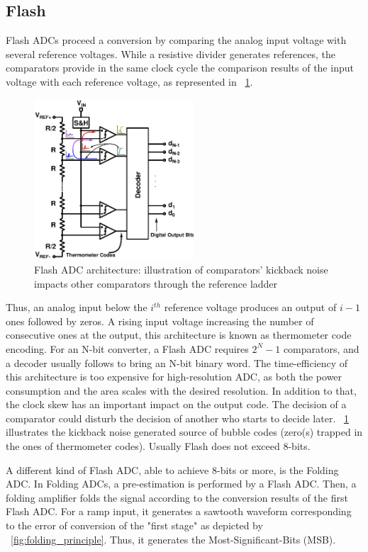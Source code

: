 \subsection{Flash}                             %
\label{sec:flash-adc}
Flash ADCs proceed a conversion by comparing the analog input voltage with several reference voltages. While a resistive divider generates references, the comparators provide in the same clock cycle the comparison results of the input voltage with each reference voltage, as represented in \figurename~\ref{fig:flash_kickback}.

\begin{figure}[htp]
	\centering
	\includegraphics[height=6cm]{Chapter3/Figs/flash_adc.ps}
	\caption{Flash ADC architecture: illustration of comparators' kickback noise impacts other comparators through the reference ladder}
	\label{fig:flash_kickback}
\end{figure}

Thus, an analog input below the \(i^{th} \) reference voltage produces an output of \(i-1 \) ones followed by zeros. A rising input voltage increasing the number of consecutive ones at the output, this architecture is known as thermometer code encoding. For an N-bit converter, a Flash ADC requires \(2^N-1\) comparators, and a decoder usually follows to bring an N-bit binary word. The time-efficiency of this architecture is too expensive for high-resolution ADC, as both the power consumption and the area scales with the desired resolution. In addition to that, the clock skew has an important impact on the output code. The decision of a comparator could disturb the decision of another who starts to decide later. \figurename~\ref{fig:flash_kickback} illustrates the kickback noise generated source of bubble codes (zero(s) trapped in the ones of thermometer codes). Usually Flash does not exceed 8-bits.

A different kind of Flash ADC, able to achieve 8-bits or more, is the Folding ADC. In Folding ADCs, a pre-estimation is performed by a Flash ADC. Then, a folding amplifier folds the signal according to the conversion results of the first Flash ADC. For a ramp input, it generates a sawtooth waveform corresponding to the error of conversion of the "first stage" as depicted by \figurename~\ref{fig:folding_principle}. Thus, it generates the Most-Significant-Bits (MSB).

